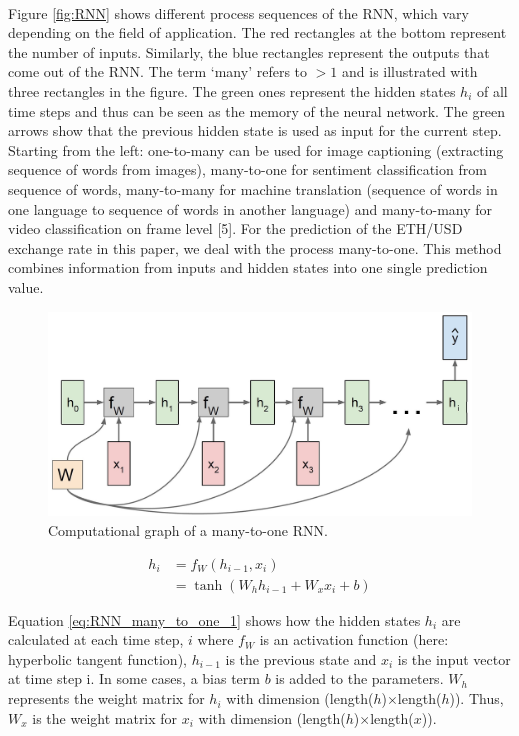 \documentclass[
]{article}
\begin{document}
~

Figure \ref{fig:RNN} shows different process sequences of the RNN, which
vary depending on the field of application. The red rectangles at the
bottom represent the number of inputs. Similarly, the blue rectangles
represent the outputs that come out of the RNN. The term `many' refers
to \(>1\) and is illustrated with three rectangles in the figure. The
green ones represent the hidden states \(h_i\) of all time steps and
thus can be seen as the memory of the neural network. The green arrows
show that the previous hidden state is used as input for the current
step. Starting from the left: one-to-many can be used for image
captioning (extracting sequence of words from images), many-to-one for
sentiment classification from sequence of words, many-to-many for
machine translation (sequence of words in one language to sequence of
words in another language) and many-to-many for video classification on
frame level {[}5{]}. For the prediction of the ETH/USD exchange rate in
this paper, we deal with the process many-to-one. This method combines
information from inputs and hidden states into one single prediction
value.

\begin{figure}

{\centering \includegraphics[width=0.7\linewidth]{images/RNN_many_to_one} 

}

\caption{Computational graph of a many-to-one RNN.}\label{fig:RNN_many_to_one}
\end{figure}

\begin{align} \label{eq:RNN_many_to_one_1}
  h_{i} & = f_{W}(h_{i-1}, x_{i}) \\
  & = \tanh(W_{h}h_{i-1} + W_{x}x_{i} + b) \nonumber 
\end{align}

Equation \ref{eq:RNN_many_to_one_1} shows how the hidden states
\(h_{i}\) are calculated at each time step, \(i\) where \(f_{W}\) is an
activation function (here: hyperbolic tangent function), \(h_{i-1}\) is
the previous state and \(x_i\) is the input vector at time step i. In
some cases, a bias term \(b\) is added to the parameters. \(W_{h}\)
represents the weight matrix for \(h_{i}\) with dimension
(length(\(h\))\(\times\)length(\(h\))). Thus, \(W_{x}\) is the weight
matrix for \(x_{i}\) with dimension
(length(\(h\))\(\times\)length(\(x\))).
\end{document}
